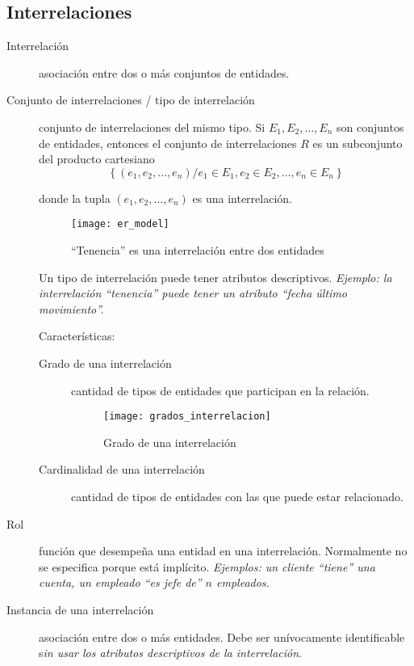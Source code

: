\documentclass[a4paper, twoside]{article}
\begin{document}
\subsection{Interrelaciones}
\begin{description}
	\item[Interrelación] asociación entre dos o más conjuntos de entidades.

	\item[Conjunto de interrelaciones / tipo de interrelación] conjunto de interrelaciones del mismo tipo. Si $E_{1},E_{2},\ldots,E_{n}$ son conjuntos de entidades, entonces el conjunto de interrelaciones $R$ es un subconjunto del producto cartesiano
	\[
		\left\{ \left(e_{1},e_{2},\ldots,e_{n}\right)/e_{1}\in E_{1},e_{2}\in E_{2},\ldots,e_{n}\in E_{n}\right\} 
	\]

	donde la tupla $\left(e_{1},e_{2},\ldots,e_{n}\right)$ es una interrelación.
	\begin{figure}[H]
		\centering
		\texttt{[image: er\_model]}
		\caption{``Tenencia'' es una interrelación entre dos entidades}
	\end{figure}

	Un tipo de interrelación puede tener atributos descriptivos. \emph{Ejemplo: la interrelación ``tenencia'' puede tener un atributo ``fecha último movimiento''.}

	Características:
	\begin{description}
		\item[Grado de una interrelación] cantidad de tipos de entidades que participan en la relación.
		\begin{figure}[H]
			\centering
			\texttt{[image: grados\_interrelacion]}
			\caption{Grado de una interrelación}
		\end{figure}

		\item[Cardinalidad de una interrelación] cantidad de tipos de entidades con las que puede estar relacionado.
	\end{description}

	\item[Rol] función que desempeña una entidad en una interrelación. Normalmente no se especifica porque está implícito. \emph{Ejemplos: un cliente ``tiene'' una cuenta, un empleado ``es jefe de'' $n$ empleados.}
	\item[Instancia de una interrelación] asociación entre dos o más entidades. Debe ser unívocamente identificable s\emph{in usar los atributos descriptivos de la interrelación}.
\end{description}
\end{document}
